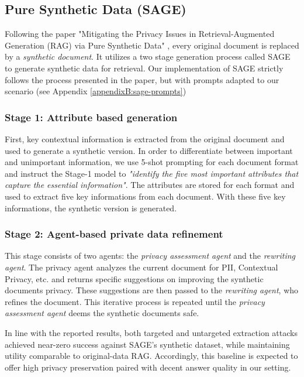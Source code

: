 \subsection*{Pure Synthetic Data (SAGE)}\label{evaluation-subsec:sage}
Following the paper "Mitigating the Privacy Issues in Retrieval-Augmented Generation (RAG) via Pure Synthetic Data" \cite{ragSAGE}, every original document is replaced by a \emph{synthetic document}. It utilizes a two stage generation process called \ac{SAGE} to generate synthetic data for retrieval. Our implementation of \ac{SAGE} strictly follows the process presented in the paper, but with prompts adapted to our scenario (see Appendix \ref{appendixB:sage-prompts})

\subsubsection*{Stage 1: Attribute based generation}
First, key contextual information is extracted from the original document and used to generate a synthetic version. In order to differentiate between important and unimportant information, we use 5-shot prompting for each document format and instruct the Stage-1 model to \textit{"identify the five most important attributes that capture the essential information"}. The attributes are stored for each format and used to extract five key informations from each document. With these five key informations, the synthetic version is generated.

\subsubsection*{Stage 2: Agent-based private data refinement}
This stage consists of two agents: the \textit{privacy assessment agent} and the \textit{rewriting agent}. The privacy agent analyzes the current document for \ac{PII}, Contextual Privacy, etc. and returns specific suggestions on improving the synthetic documents privacy. These suggestions are then passed to the \textit{rewriting agent}, who refines the document. This iterative process is repeated until the  \textit{privacy assessment agent} deems the synthetic documents safe.

In line with the reported results, both targeted and untargeted extraction attacks achieved near-zero success against SAGE's synthetic dataset, while maintaining utility comparable to original-data \ac{RAG}. Accordingly, this baseline is expected to offer high privacy preservation paired with decent answer quality in our setting.




